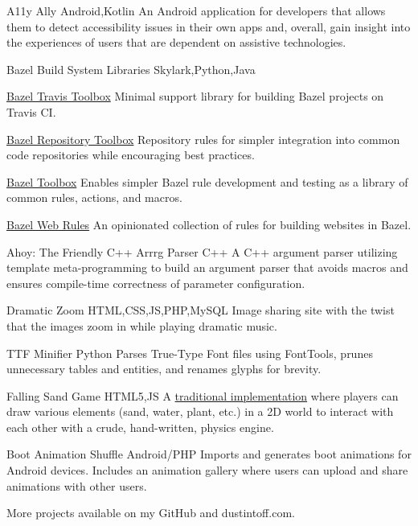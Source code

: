  {A11y Ally} {Android,Kotlin} {
    An Android application for developers that allows them to detect accessibility issues in their own apps and, overall, gain insight into the experiences of users that are dependent on assistive technologies.
}

\personalProject {} {Bazel Build System Libraries} {Skylark,Python,Java} {
    \begin {minimalItemize}
        \item \href {https://github.com/quittle/bazel_travis_toolbox} {Bazel Travis Toolbox} \spaceendash Minimal support library for building Bazel projects on Travis CI\@.
        \item \href {https://github.com/quittle/bazel_repository_toolbox} {Bazel Repository Toolbox} \spaceendash Repository rules for simpler integration into common code repositories while encouraging best practices.
        \item \href {https://github.com/quittle/bazel_toolbox} {Bazel Toolbox} \spaceendash Enables simpler Bazel rule development and testing as a library of common rules, actions, and macros.
        \item \href {https://github.com/quittle/rules_web} {Bazel Web Rules} \spaceendash An opinionated collection of rules for building websites in Bazel.
    \end {minimalItemize}
}

 {Ahoy: The Friendly C++ Arrrg Parser} {C++} {
    A C++ argument parser utilizing template meta-programming to build an argument parser that avoids macros and ensures compile-time correctness of parameter configuration.
}

 {Dramatic Zoom} {HTML,CSS,JS,PHP,MySQL} {
    Image sharing site with the twist that the images  {zoom in while playing dramatic music}.
}

 {TTF Minifier} {Python} {
    Parses True-Type Font files using  {FontTools}, prunes unnecessary tables and entities, and renames glyphs for brevity.
}

 {Falling Sand Game} {HTML5,JS} {
    A \href {https://en.wikipedia.org/wiki/Falling-sand_game} {traditional implementation} where players can draw various elements (sand, water, plant, etc.) in a 2D world to interact with each other with a crude, hand-written, physics engine.
}

\personalProject {} {Boot Animation Shuffle} {Android/PHP} {
    Imports and generates boot animations for Android devices. Includes an animation gallery where users can upload and share animations with other users.
}

More projects available on { {my GitHub}} and { {dustintoff.com}}.
